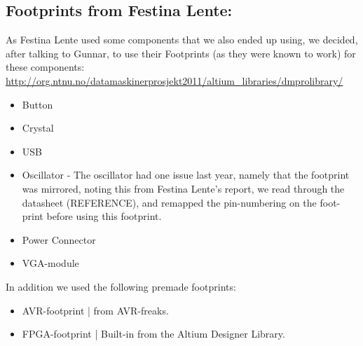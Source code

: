 \subsection{Footprints from Festina Lente:}
As Festina Lente used some components that we also ended up using, we decided,
after talking to Gunnar, to use
their Footprints (as they were known to work) for these components:
\url{http://org.ntnu.no/datamaskinerprosjekt2011/altium_libraries/dmprolibrary/}
\begin{itemize}
\item Button
\item Crystal
\item USB
\item Oscillator - The oscillator had one issue last year, namely that the
  footprint was mirrored, noting this from Festina Lente's report, we read
  through the datasheet (REFERENCE), and remapped the
  pin-numbering on the foot-print before using this footprint.
\item Power Connector
\item VGA-module
\end{itemize}

In addition we used the following premade footprints:
\begin{itemize}
\item AVR-footprint | from AVR-freaks.
\item FPGA-footprint | Built-in from the Altium Designer Library.
\end{itemize}

